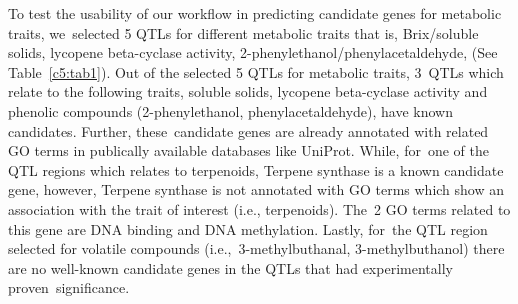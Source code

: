 \documentclass[applsci,article,accept,moreauthors,pdftex]{Definitions/mdpi}
\begin{document}
{To test the usability of our workflow in predicting candidate genes for metabolic traits, we~selected 5 QTLs for different metabolic traits that is, Brix/soluble solids, lycopene beta-cyclase activity, 2-phenylethanol/phenylacetaldehyde, (See Table~\ref{c5:tab1}). Out of the selected 5 QTLs for metabolic traits, 3~QTLs which relate to the following traits, soluble solids, lycopene beta-cyclase activity and phenolic compounds (2-phenylethanol, phenylacetaldehyde), have known candidates. Further, these~candidate genes are already annotated with related GO terms in publically available databases like UniProt. While, for~one of the QTL regions which relates to terpenoids, Terpene synthase is a known candidate gene, however, Terpene synthase is not annotated with GO terms which show an association with the trait of interest (i.e., terpenoids). The~2 GO terms related to this gene are DNA binding and DNA methylation. Lastly, for~the QTL region selected for volatile compounds (i.e.,~3-methylbuthanal, 3-methylbuthanol) there are no well-known candidate genes in the QTLs that had experimentally proven~significance. 

}
\end{document}
